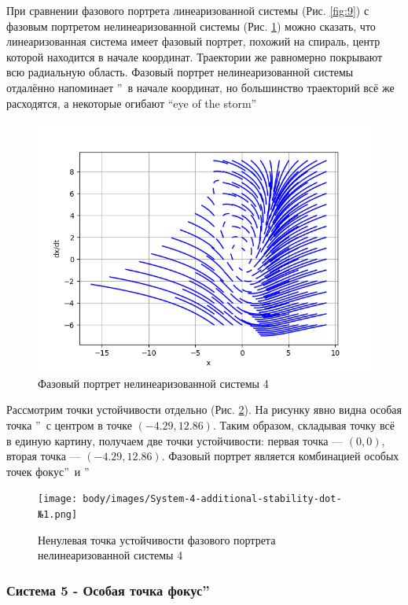 При сравнении фазового портрета линеаризованной системы (Рис. \ref{fig:9}) с фазовым портретом нелинеаризованной системы
(Рис. \ref{fig:10}) можно сказать, что линеаризованная система имеет фазовый портрет, похожий на спираль, центр которой
находится в начале координат. Траектории же равномерно покрывают всю радиальную область. Фазовый портрет нелинеаризованной
системы отдалённо напоминает \textquotedblright\ в начале координат, но большинство траекторий
всё же расходятся, а некоторые огибают \textquotedblleft eye of the storm\textquotedblright

\begin{figure}[H]
	\centering
	\includegraphics[width=0.6\linewidth]{body/images/System-4.png}
	\caption{Фазовый портрет нелинеаризованной системы 4}
	\label{fig:10}
\end{figure}

Рассмотрим точки устойчивости отдельно (Рис. \ref{fig:11}). На рисунку явно видна особая
точка \textquotedblright\ с центром в точке $(-4.29, 12.86)$. Таким образом,
складывая точку всё в единую картину, получаем две точки устойчивости: первая точка — $(0, 0)$,
вторая точка — $(-4.29, 12.86)$. Фазовый портрет является комбинацией особых точек
 фокус\textquotedblright\ и \textquotedblright

\begin{figure}[H]
	\centering
	\texttt{[image: body/images/System-4-additional-stability-dot-№1.png]}
	\caption{Ненулевая точка устойчивости фазового портрета нелинеаризованной системы 4}
	\label{fig:11}
\end{figure}

\subsubsection{Система 5 - Особая точка  фокус\textquotedblright}

